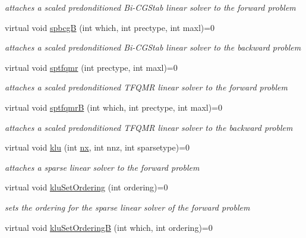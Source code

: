 \begin{DoxyCompactItemize}
\begin{DoxyCompactList}\small\item\em attaches a scaled predonditioned Bi-\/\+C\+G\+Stab linear solver to the forward problem \end{DoxyCompactList}\item 
virtual void \mbox{\hyperlink{classamici_1_1_solver_a9b165bfcf1a6a482a6c9bd84197df6e2}{spbcgB}} (int which, int prectype, int maxl)=0
\begin{DoxyCompactList}\small\item\em attaches a scaled predonditioned Bi-\/\+C\+G\+Stab linear solver to the backward problem \end{DoxyCompactList}\item 
virtual void \mbox{\hyperlink{classamici_1_1_solver_ad58de0bff9b336ed3a053a79fb8e6c80}{sptfqmr}} (int prectype, int maxl)=0
\begin{DoxyCompactList}\small\item\em attaches a scaled predonditioned T\+F\+Q\+MR linear solver to the forward problem \end{DoxyCompactList}\item 
virtual void \mbox{\hyperlink{classamici_1_1_solver_a4504b729da34114dd11eab83161c5670}{sptfqmrB}} (int which, int prectype, int maxl)=0
\begin{DoxyCompactList}\small\item\em attaches a scaled predonditioned T\+F\+Q\+MR linear solver to the backward problem \end{DoxyCompactList}\item 
virtual void \mbox{\hyperlink{classamici_1_1_solver_a4d8be62dca7f7db6563b9b3261a44c01}{klu}} (int \mbox{\hyperlink{classamici_1_1_solver_a86a18c4e461de76881b6af72e4feb8d9}{nx}}, int nnz, int sparsetype)=0
\begin{DoxyCompactList}\small\item\em attaches a sparse linear solver to the forward problem \end{DoxyCompactList}\item 
virtual void \mbox{\hyperlink{classamici_1_1_solver_a30d4c8cfff0c6a74116b15bcfeecbd33}{klu\+Set\+Ordering}} (int ordering)=0
\begin{DoxyCompactList}\small\item\em sets the ordering for the sparse linear solver of the forward problem \end{DoxyCompactList}\item 
virtual void \mbox{\hyperlink{classamici_1_1_solver_aa24ecf586126da19bb338ec8d08fe323}{klu\+Set\+OrderingB}} (int which, int ordering)=0

\end{DoxyCompactItemize}
